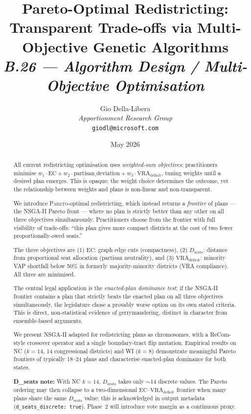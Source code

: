 \documentclass[12pt]{article}
\title{%
  \textbf{Pareto-Optimal Redistricting:}\\
  \textbf{Transparent Trade-offs via Multi-Objective Genetic Algorithms}\\[0.8em]
  \normalsize\textit{B.26 --- Algorithm Design / Multi-Objective Optimisation}%
}
\author{%
  Gio Della-Libera\\
  \textit{Apportionment Research Group}\\
  \small\texttt{giodl@microsoft.com}
}
\date{May 2026}
\newcommand{\pareto}{\textsc{Pareto}}
\newcommand{\EC}{\ensuremath{\mathrm{EC}}}
\newcommand{\Dseats}{\ensuremath{D_{\mathrm{seats}}}}
\newcommand{\VRA}{\ensuremath{\mathrm{VRA}_{\mathrm{deficit}}}}
\begin{document}
\maketitle

\begin{abstract}
\noindent
All current redistricting optimisation uses \emph{weighted-sum objectives}: practitioners
minimise $w_1 \cdot \EC + w_2 \cdot \text{partisan\_deviation} + w_3 \cdot \VRA$,
tuning weights until a desired plan emerges.
This is opaque: the weight choice determines the outcome, yet the relationship
between weights and plans is non-linear and non-transparent.

We introduce \pareto{}-optimal redistricting, which instead returns a
\emph{frontier} of plans --- the NSGA-II Pareto front --- where no plan is
strictly better than any other on all three objectives simultaneously.
Practitioners choose from the frontier with full visibility of trade-offs:
``this plan gives more compact districts at the cost of two fewer
proportionally-owed seats.''

The three objectives are (1) \EC: graph edge cuts (compactness),
(2) $\Dseats$: distance from proportional seat allocation (partisan
neutrality), and (3) $\VRA$: minority VAP shortfall below 50\% in
formerly majority-minority districts (VRA compliance).
All three are minimised.

The central legal application is the \emph{enacted-plan dominance test}:
if the NSGA-II frontier contains a plan that strictly beats the enacted plan
on all three objectives simultaneously, the legislature chose a provably worse
option on its own stated criteria.
This is direct, non-statistical evidence of gerrymandering, distinct in
character from ensemble-based arguments.

We present NSGA-II adapted for redistricting plans as chromosomes, with a
ReCom-style crossover operator and a single boundary-tract flip mutation.
Empirical results on NC ($k=14$, 14 congressional districts) and WI ($k=8$)
demonstrate meaningful Pareto frontiers of typically 18--24 plans and characterise
enacted-plan dominance for both states.

\textbf{D\_seats note:} With NC $k=14$, $\Dseats$ takes only $\sim$14 discrete
values.  The Pareto ordering may then collapse to a two-dimensional
$\EC$--$\VRA$ frontier when many plans share the same $\Dseats$ value;
this is acknowledged in output metadata (\texttt{d\_seats\_discrete: true}).
Phase~2 will introduce vote margin as a continuous proxy.
\end{abstract}

\tableofcontents
\newpage










\end{document}
